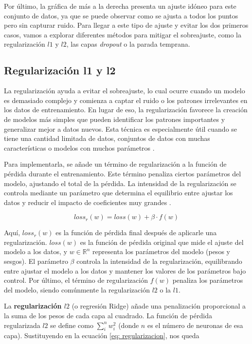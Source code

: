 Por último, la gráfica de más a la derecha presenta un ajuste idóneo para este conjunto de datos, ya que se puede observar como se ajusta a todos los puntos pero sin capturar ruido. Para llegar a este tipo de ajuste y evitar los dos primeros casos, vamos a explorar diferentes métodos para mitigar el sobreajuste, como la regularización $l1$ y $l2$, las capas \textit{dropout} o la parada temprana.

\subsection{Regularización l1 y l2} \label{sec:regularizacion}

La regularización ayuda a evitar el sobreajuste, lo cual ocurre cuando un modelo es demasiado complejo y comienza a captar el ruido o los patrones irrelevantes en los datos de entrenamiento. En lugar de eso, la regularización favorece la creación de modelos más simples que pueden identificar los patrones importantes y generalizar mejor a datos nuevos. Esta técnica es especialmente útil cuando se tiene una cantidad limitada de datos, conjuntos de datos con muchas características o modelos con muchos parámetros \citep{pajares2021aprendizaje}.

Para implementarla, se añade un término de regularización a la función de pérdida durante el entrenamiento. Este término penaliza ciertos parámetros del modelo, ajustando el total de la pérdida. La intensidad de la regularización se controla mediante un parámetro que determina el equilibrio entre ajustar los datos y reducir el impacto de coeficientes muy grandes \citep{geron2022hands}.

\begin{equation}
loss_{r}(w) = loss(w) + \beta \cdot f(w) 
\end{equation} \label{eq: regularizacion}

Aquí, \( loss_{r}(w) \) es la función de pérdida final después de aplicarle una regularización. \( loss(w) \) es la función de pérdida original que mide el ajuste del modelo a los datos, y \( w \in \mathbb{R}^n\) representa los parámetros del modelo (pesos y sesgos). El parámetro \(\beta\) controla la intensidad de la regularización, equilibrando entre ajustar el modelo a los datos y mantener los valores de los parámetros bajo control. Por último, el término de regularización \( f(w) \) penaliza los parámetros del modelo, siendo comúnmente la regularización $l2$ o la $l1$. 
 

La \textbf{regularización \(l2\)} (o regresión Ridge) añade una penalización proporcional a la suma de los pesos de cada capa al cuadrado. La función de pérdida regularizada \(l2\) se define como $\sum_{i}^n w_i^2$ (donde $n$ es el número de neuronas de esa capa). Sustituyendo en la ecuación \ref{eq: regularizacion}, nos queda

